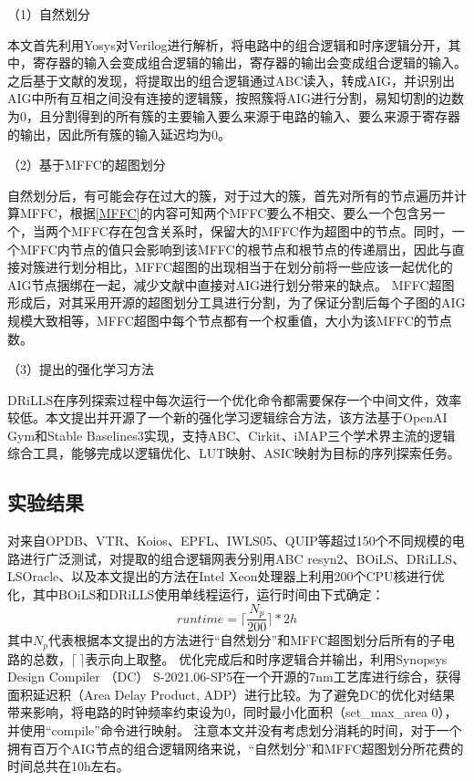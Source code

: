（1）自然划分

本文首先利用Yosys对Verilog进行解析，将电路中的组合逻辑和时序逻辑分开，其中，寄存器的输入会变成组合逻辑的输出，寄存器的输出会变成组合逻辑的输入。之后基于文献\cite{Moucheng_Yang}的发现，将提取出的组合逻辑通过ABC读入，转成AIG，并识别出AIG中所有互相之间没有连接的逻辑簇，按照簇将AIG进行分割，易知切割的边数为0，且分割得到的所有簇的主要输入要么来源于电路的输入、要么来源于寄存器的输出，因此所有簇的输入延迟均为0。

（2）基于MFFC的超图划分

自然划分后，有可能会存在过大的簇，对于过大的簇，首先对所有的节点遍历并计算MFFC，根据\ref{MFFC}的内容可知两个MFFC要么不相交、要么一个包含另一个，当两个MFFC存在包含关系时，保留大的MFFC作为超图中的节点。同时，一个MFFC内节点的值只会影响到该MFFC的根节点和根节点的传递扇出，因此与直接对簇进行划分相比，MFFC超图的出现相当于在划分前将一些应该一起优化的AIG节点捆绑在一起，减少文献\cite{LS:LSOracle}中直接对AIG进行划分带来的缺点。
MFFC超图形成后，对其采用开源的超图划分工具\cite{KaHyPar}进行分割，为了保证分割后每个子图的AIG规模大致相等，MFFC超图中每个节点都有一个权重值，大小为该MFFC的节点数。

（3）提出的强化学习方法

DRiLLS\cite{LS:DRiLLS}在序列探索过程中每次运行一个优化命令都需要保存一个中间文件，效率较低。本文提出并开源了一个新的强化学习逻辑综合方法，该方法基于OpenAI Gym\cite{AI:gym}和Stable Baselines3\cite{AI:stable-baselines3}实现，支持ABC\cite{LS:ABC}、Cirkit\cite{LS:cirkit}、iMAP\cite{LS:iMAP}三个学术界主流的逻辑综合工具，能够完成以逻辑优化、LUT映射、ASIC映射为目标的序列探索任务。

\subsection{实验结果}

对来自OPDB\cite{LS:OPDB}、VTR\cite{FPGA:vtr8}、Koios\cite{FPGA:Koios}、EPFL\cite{LS:EPFL_benchs_iwls,LS:EPFL_benchs_github}、IWLS05\cite{LS:iwls05}、QUIP\cite{LS:quip}等超过150个不同规模的电路进行广泛测试，对提取的组合逻辑网表分别用ABC resyn2、BOiLS\cite{LS:BOiLS}、DRiLLS\cite{LS:DRiLLS}、LSOracle\cite{LS:LSOracle}、以及本文提出的方法在Intel Xeon处理器上利用200个CPU核进行优化，其中BOiLS和DRiLLS使用单线程运行，运行时间由下式确定：
\begin{equation}
    runtime = \lceil \frac{N_{p}}{200} \rceil * 2 h
\end{equation}
其中$N_{p}$代表根据本文提出的方法进行“自然划分”和MFFC超图划分后所有的子电路的总数，$\lceil \ \rceil$表示向上取整。
优化完成后和时序逻辑合并输出，利用Synopsys Design Compiler （DC） S-2021.06-SP5在一个开源的7nm工艺库\cite{ASAP7_github}进行综合，获得面积延迟积（Area Delay Product, ADP）进行比较。为了避免DC的优化对结果带来影响，将电路的时钟频率约束设为0，同时最小化面积（set\_max\_area 0），并使用“compile”命令进行映射。
注意本文并没有考虑划分消耗的时间，对于一个拥有百万个AIG节点的组合逻辑网络来说，“自然划分”和MFFC超图划分所花费的时间总共在10h左右。

